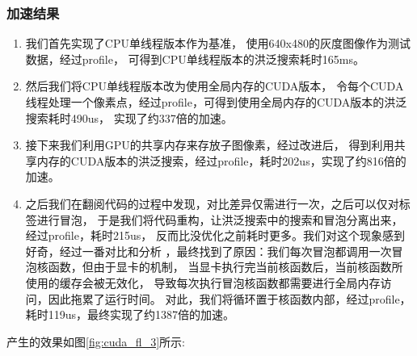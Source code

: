 \documentclass[a4paper, 11pt]{article}
\begin{document}
\subsubsection{加速结果}
\begin{enumerate}
	\item 我们首先实现了CPU单线程版本作为基准，
	使用640x480的灰度图像作为测试数据，经过profile，
	可得到CPU单线程版本的洪泛搜索耗时165ms。
	
	\item 然后我们将CPU单线程版本改为使用全局内存的CUDA版本，
	令每个CUDA线程处理一个像素点，经过profile，可得到使用全局内存的CUDA版本的洪泛搜索耗时490us，
	实现了约337倍的加速。
	
	\item 接下来我们利用GPU的共享内存来存放子图像素，经过改进后，
	得到利用共享内存的CUDA版本的洪泛搜索，经过profile，耗时202us，实现了约816倍的加速。
	
	\item 之后我们在翻阅代码的过程中发现，对比差异仅需进行一次，之后可以仅对标签进行冒泡，
	于是我们将代码重构，让洪泛搜索中的搜索和冒泡分离出来，经过profile，耗时215us，
	反而比没优化之前耗时更多。我们对这个现象感到好奇，经过一番对比和分析
	，最终找到了原因：我们每次冒泡都调用一次冒泡核函数，但由于显卡的机制，
	当显卡执行完当前核函数后，当前核函数所使用的缓存会被无效化，
	导致每次执行冒泡核函数都需要进行全局内存访问，因此拖累了运行时间。
	对此，我们将循环置于核函数内部，经过profile，耗时119us，最终实现了约1387倍的加速。
\end{enumerate}

产生的效果如图\ref{fig:cuda_fl_3}所示:
\end{document}
